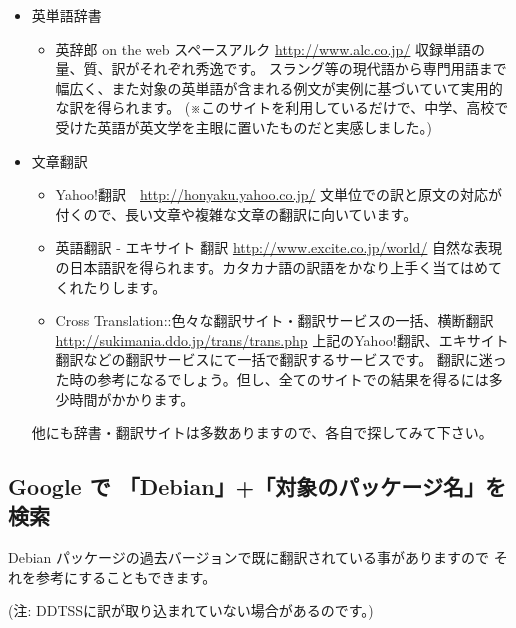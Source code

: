 \documentclass[mingoth,a4paper]{jsarticle}
\begin{document}
\begin{itemize}
 \item{英単語辞書
  \begin{itemize}
   \item{英辞郎 on the web スペースアルク \url{http://www.alc.co.jp/}
収録単語の量、質、訳がそれぞれ秀逸です。
スラング等の現代語から専門用語まで幅広く、また対象の英単語が含まれる例文が実例に基づいていて実用的な訳を得られます。
(※このサイトを利用しているだけで、中学、高校で受けた英語が英文学を主眼に置いたものだと実感しました。)}
  \end{itemize}
 }
 \item{文章翻訳
  \begin{itemize}
   \item{Yahoo!翻訳　\url{http://honyaku.yahoo.co.jp/}
   文単位での訳と原文の対応が付くので、長い文章や複雑な文章の翻訳に向いています。}

   \item{英語翻訳 - エキサイト 翻訳
     \url{http://www.excite.co.jp/world/}
   自然な表現の日本語訳を得られます。カタカナ語の訳語をかなり上手く当てはめてくれたりします。}

   \item{Cross Translation::色々な翻訳サイト・翻訳サービスの一括、横断翻訳
     \url{http://sukimania.ddo.jp/trans/trans.php}
   上記のYahoo!翻訳、エキサイト 翻訳などの翻訳サービスにて一括で翻訳するサービスです。
   翻訳に迷った時の参考になるでしょう。但し、全てのサイトでの結果を得るには多少時間がかかります。}
  \end{itemize}
  他にも辞書・翻訳サイトは多数ありますので、各自で探してみて下さい。
 }
\end{itemize}


\subsection{Google で 「Debian」+「対象のパッケージ名」を検索}
Debian パッケージの過去バージョンで既に翻訳されている事がありますので
それを参考にすることもできます。

(注: DDTSSに訳が取り込まれていない場合があるのです。)
\end{document}
